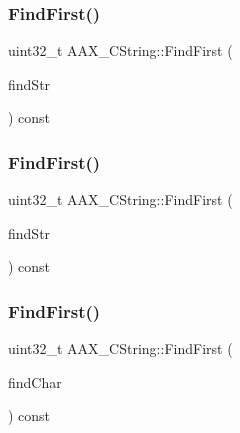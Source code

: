 \mbox{\label{a01573_ab748c054c346f7ea863b51cea4fc52cb}} 
\subsubsection{\texorpdfstring{FindFirst()}{FindFirst()}\hspace{0.1cm}{\footnotesize\ttfamily [1/3]}}
{\footnotesize\ttfamily uint32\+\_\+t A\+A\+X\+\_\+\+C\+String\+::\+Find\+First (\begin{DoxyParamCaption}\item[{const \mbox{\hyperlink{a01573}{A\+A\+X\+\_\+\+C\+String}} \&}]{find\+Str }\end{DoxyParamCaption}) const}

\mbox{\label{a01573_ae4f44312e8e2e57e268974e0849ad48c}} 
\subsubsection{\texorpdfstring{FindFirst()}{FindFirst()}\hspace{0.1cm}{\footnotesize\ttfamily [2/3]}}
{\footnotesize\ttfamily uint32\+\_\+t A\+A\+X\+\_\+\+C\+String\+::\+Find\+First (\begin{DoxyParamCaption}\item[{const char $\ast$}]{find\+Str }\end{DoxyParamCaption}) const}

\mbox{\label{a01573_a5af7f56b71f9b5a7d30d71b65bc30f87}} 
\subsubsection{\texorpdfstring{FindFirst()}{FindFirst()}\hspace{0.1cm}{\footnotesize\ttfamily [3/3]}}
{\footnotesize\ttfamily uint32\+\_\+t A\+A\+X\+\_\+\+C\+String\+::\+Find\+First (\begin{DoxyParamCaption}\item[{char}]{find\+Char }\end{DoxyParamCaption}) const}

